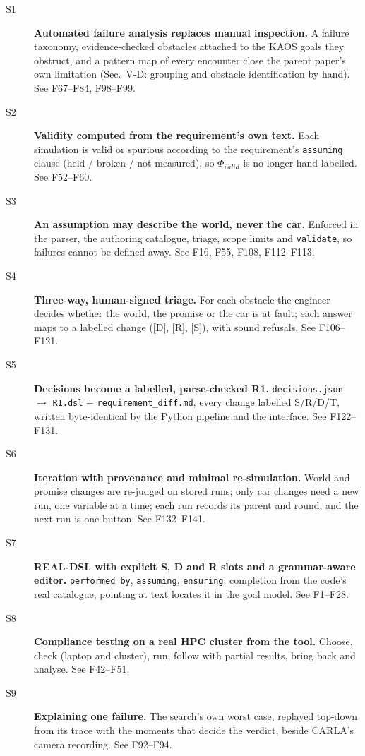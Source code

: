 \begin{description}
\item[S1] \textbf{Automated failure analysis replaces manual inspection.} A failure taxonomy, evidence-checked obstacles attached to the KAOS goals they obstruct, and a pattern map of every encounter close the parent paper's own limitation (Sec.~V-D: grouping and obstacle identification by hand). See F67--F84, F98--F99.
\item[S2] \textbf{Validity computed from the requirement's own text.} Each simulation is valid or spurious according to the requirement's \texttt{assuming} clause (held / broken / not measured), so $\Phi_{valid}$ is no longer hand-labelled. See F52--F60.
\item[S3] \textbf{An assumption may describe the world, never the car.} Enforced in the parser, the authoring catalogue, triage, scope limits and \texttt{validate}, so failures cannot be defined away. See F16, F55, F108, F112--F113.
\item[S4] \textbf{Three-way, human-signed triage.} For each obstacle the engineer decides whether the world, the promise or the car is at fault; each answer maps to a labelled change ([D], [R], [S]), with sound refusals. See F106--F121.
\item[S5] \textbf{Decisions become a labelled, parse-checked R1.} \texttt{decisions.json} $\rightarrow$ \texttt{R1.dsl} + \texttt{requirement\_diff.md}, every change labelled S/R/D/T, written byte-identical by the Python pipeline and the interface. See F122--F131.
\item[S6] \textbf{Iteration with provenance and minimal re-simulation.} World and promise changes are re-judged on stored runs; only car changes need a new run, one variable at a time; each run records its parent and round, and the next run is one button. See F132--F141.
\item[S7] \textbf{REAL-DSL with explicit S, D and R slots and a grammar-aware editor.} \texttt{performed by}, \texttt{assuming}, \texttt{ensuring}; completion from the code's real catalogue; pointing at text locates it in the goal model. See F1--F28.
\item[S8] \textbf{Compliance testing on a real HPC cluster from the tool.} Choose, check (laptop and cluster), run, follow with partial results, bring back and analyse. See F42--F51.
\item[S9] \textbf{Explaining one failure.} The search's own worst case, replayed top-down from its trace with the moments that decide the verdict, beside CARLA's camera recording. See F92--F94.

\end{description}
